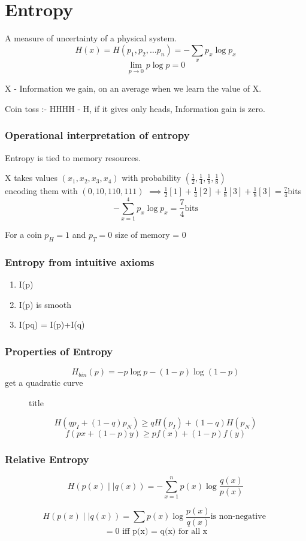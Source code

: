 \chapter{Entropy}
\begin{definition}[Entropy]
	A measure of uncertainty of a physical system.
	\[
		H(x) = H(p_1,p_2,\ldots p_n ) = -\sum_x p_x \log p_x
	\]
	\[
		\lim\limits_{p \to 0} p\log p = 0
	\]
\end{definition}
X - Information we gain, on an average when we learn the value of X.
\begin{eg}
	Coin toss :- HHHH - H, if it gives only heads, Information gain is zero.
\end{eg}
\subsection*{Operational interpretation of entropy}
Entropy is tied to memory resources. 
\begin{eg}
	X  takes values \((x_1, x_2 , x_3, x_4)\) with probability \((\frac{1}{2},\frac{1}{4},\frac{1}{8},\frac{1}{8})\)\\ encoding them with \((0,10,110,111)\) \(\implies \frac{1}{2}[1]+\frac{1}{4}[2]+\frac{1}{8}[3]+\frac{1}{8}[3] = \frac{7}{4}\)bits
	\[
		-\sum\limits_{x=1}^{4} p_x \log p_x = \frac{7}{4} \text{bits}
	\]
\end{eg}
\begin{eg}
	For a coin \(p_H = 1\) and \(p_T = 0\) size of memory = 0
\end{eg}
\subsection*{Entropy from intuitive axioms}
\begin{enumerate}
	\item I(p)
	\item I(p) is smooth
	\item I(pq) = I(p)+I(q)
\end{enumerate}
\subsection*{Properties of Entropy}
\[
	H_{bin}(p) = -p\log p -(1-p)\log (1-p) 
\]
get a quadratic curve
\begin{figure}[H]
	\centering
	\caption{title}
	\label{fig:quad}
\end{figure}
\[
	H(q p_I +(1-q)p_N) \geq qH(p_I)+(1-q)H(p_N)
\]
\[
	f(px + (1-p)y)\geq pf(x)+(1-p)f(y)
\]
\subsection*{Relative Entropy}
\begin{definition}
	\[
		H(p(x)\mid \mid q(x)) = - \sum\limits_{x=1}^{n} p(x) \log \frac{q(x)}{p(x)} 
	\]
\end{definition}
\begin{theorem}
	\[
		H(p(x)\mid \mid q(x)) = \sum p(x) \log \frac{p(x)}{q(x)} \text{is non-negative }
	\]
	\[
		= 0 \text{ iff p(x) = q(x) for all x}
	\]
\end{theorem}